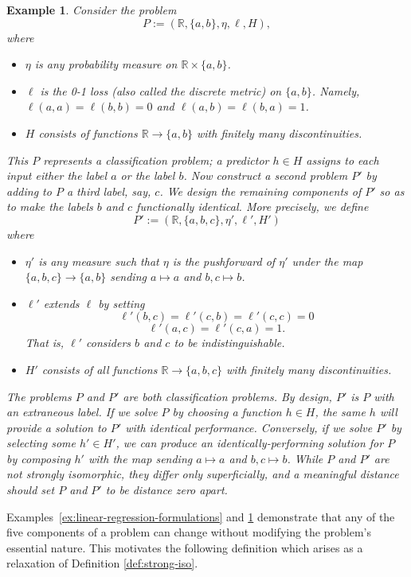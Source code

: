 \documentclass[twoside,11pt]{article}
\newtheorem{examples}[theorem]{Example}
\begin{document}
\begin{examples}\label{ex:extra-label}
    Consider the problem
    \[P := (\mathbb R, \{a,b\}, \eta, \ell, H),\]
    where
    \begin{itemize}
        \item $\eta$ is any probability measure on $\mathbb R \times \{a,b\}$.
        \item $\ell$ is the 0-1 loss (also called the discrete metric) on $\{a,b\}$. Namely, $\ell(a,a)=\ell(b,b)=0$ and $\ell(a,b)=\ell(b,a)=1$.
        \item $H$ consists of functions $\mathbb R \to \{a,b\}$ with finitely many discontinuities.
    \end{itemize}
    This $P$ represents a classification problem; a predictor $h\in H$ assigns to each input either the label $a$ or the label $b$.
    Now construct a second problem $P'$ by adding to $P$ a third label, say, $c$. We design the remaining components of $P'$ so as to make the labels $b$ and $c$ functionally identical. More precisely, we define
    \[P' := (\mathbb R, \{a,b,c\}, \eta', \ell', H')\]
    where
    \begin{itemize}
        \item $\eta'$ is any measure such that $\eta$ is the pushforward of $\eta'$ under the map $\{a,b,c\}\to \{a,b\}$ sending $a\mapsto a$ and $b,c\mapsto b$.
        \item $\ell'$ extends $\ell$ by setting
        \[\ell'(b,c) = \ell'(c,b) = \ell'(c,c) = 0\]
        \[\ell'(a,c)=\ell'(c,a) = 1.\]
        That is, $\ell'$ considers $b$ and $c$ to be indistinguishable.
        \item $H'$ consists of all functions $\mathbb R \to \{a,b,c\}$ with finitely many discontinuities.
    \end{itemize}
    
    The problems $P$ and $P'$ are both classification problems. By design, $P'$ is $P$ with an extraneous label. If we solve $P$ by choosing a function $h\in H$, the same $h$ will provide a solution to $P'$ with identical performance. Conversely, if we solve $P'$ by selecting some $h'\in H'$, we can produce an identically-performing solution for $P$ by composing $h'$ with the map sending $a\mapsto a$ and $b,c\mapsto b$. While $P$ and $P'$ are not strongly isomorphic, they differ only superficially, and a meaningful distance should set $P$ and $P'$ to be distance zero apart.
\end{examples}
    
Examples~\ref{ex:linear-regression-formulations} and \ref{ex:extra-label} demonstrate that any of the five components of a problem can change without modifying the problem's essential nature. This motivates the following definition which arises as a relaxation of Definition \ref{def:strong-iso}.
\end{document}
